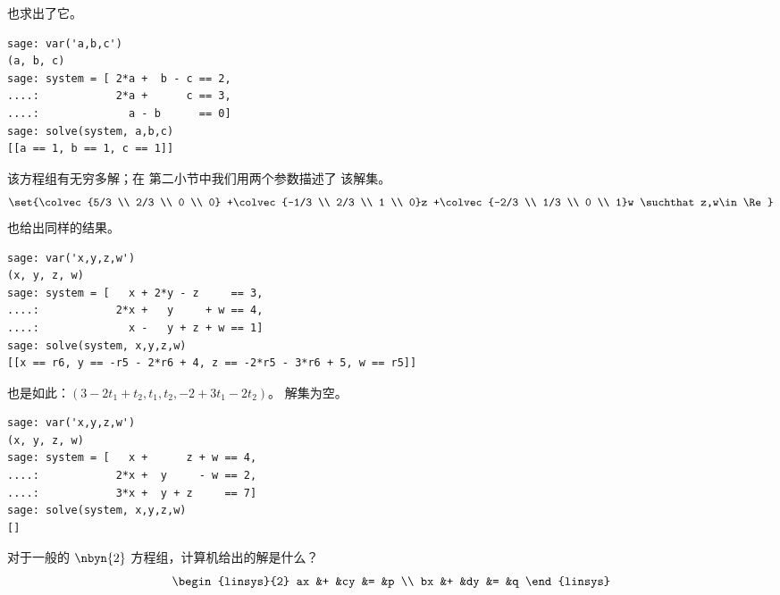 \begin{exercises}
\begin{answer}
\begin{exparts}
\begin{equation*}
           \end{equation*}
           \Sage{} 也求出了它。
\begin{lstlisting}
sage: var('a,b,c')
(a, b, c)
sage: system = [ 2*a +  b - c == 2,
....:            2*a +      c == 3,
....:              a - b      == 0]
sage: solve(system, a,b,c)
[[a == 1, b == 1, c == 1]]             
\end{lstlisting}
        \partsitem 该方程组有无穷多解；在
           第二小节中我们用两个参数描述了
           该解集。
           \begin{equation*}
             \set{\colvec{5/3 \\ 2/3 \\ 0 \\ 0}
                  +\colvec{-1/3 \\ 2/3 \\ 1 \\ 0}z
                  +\colvec{-2/3 \\ 1/3 \\ 0 \\ 1}w
                  \suchthat z,w\in\Re}
           \end{equation*}
           \Sage{} 也给出同样的结果。
\begin{lstlisting}
sage: var('x,y,z,w')
(x, y, z, w)
sage: system = [   x + 2*y - z     == 3,
....:            2*x +   y     + w == 4,
....:              x -   y + z + w == 1]
sage: solve(system, x,y,z,w)
[[x == r6, y == -r5 - 2*r6 + 4, z == -2*r5 - 3*r6 + 5, w == r5]]             
\end{lstlisting}
           \Maple{} 也是如此：$(3-2t_1+t_2,t_1,t_2,-2+3t_1-2t_2)$。
        \partsitem 解集为空。
\begin{lstlisting}
sage: var('x,y,z,w')
(x, y, z, w)
sage: system = [   x +      z + w == 4,
....:            2*x +  y     - w == 2,
....:            3*x +  y + z     == 7]
sage: solve(system, x,y,z,w)
[]          
\end{lstlisting}
      \end{exparts}
    \end{answer}
  \item 
    对于一般的
    $\nbyn{2}$ 方程组，计算机给出的解是什么？
    \begin{equation*}
      \begin{linsys}{2}
        ax  &+  &cy  &=  &p  \\
        bx  &+  &dy  &=  &q
      \end{linsys}
    \end{equation*}

\end{exercises}
